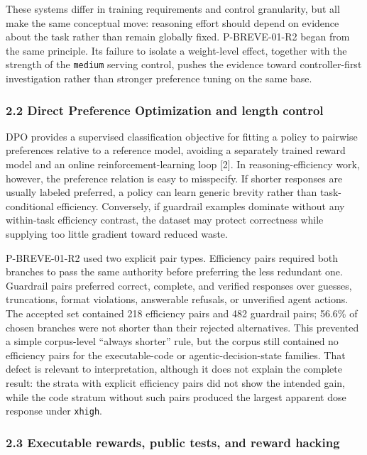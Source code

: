 \documentclass[
]{article}
\begin{document}
These systems differ in training requirements and control granularity,
but all make the same conceptual move: reasoning effort should depend on
evidence about the task rather than remain globally fixed. P-BREVE-01-R2
began from the same principle. Its failure to isolate a weight-level
effect, together with the strength of the \texttt{medium} serving
control, pushes the evidence toward controller-first investigation
rather than stronger preference tuning on the same base.

\subsubsection{2.2 Direct Preference Optimization and length
control}\label{22-direct-preference-optimization-and-length-control}

DPO provides a supervised classification objective for fitting a policy
to pairwise preferences relative to a reference model, avoiding a
separately trained reward model and an online reinforcement-learning
loop {[}2{]}. In reasoning-efficiency work, however, the preference
relation is easy to misspecify. If shorter responses are usually labeled
preferred, a policy can learn generic brevity rather than
task-conditional efficiency. Conversely, if guardrail examples dominate
without any within-task efficiency contrast, the dataset may protect
correctness while supplying too little gradient toward reduced waste.

P-BREVE-01-R2 used two explicit pair types. Efficiency pairs required
both branches to pass the same authority before preferring the less
redundant one. Guardrail pairs preferred correct, complete, and verified
responses over guesses, truncations, format violations, answerable
refusals, or unverified agent actions. The accepted set contained 218
efficiency pairs and 482 guardrail pairs; 56.6\% of chosen branches were
not shorter than their rejected alternatives. This prevented a simple
corpus-level ``always shorter'' rule, but the corpus still contained no
efficiency pairs for the executable-code or agentic-decision-state
families. That defect is relevant to interpretation, although it does
not explain the complete result: the strata with explicit efficiency
pairs did not show the intended gain, while the code stratum without
such pairs produced the largest apparent dose response under
\texttt{xhigh}.

\subsubsection{2.3 Executable rewards, public tests, and reward
hacking}\label{23-executable-rewards-public-tests-and-reward-hacking}
\end{document}
